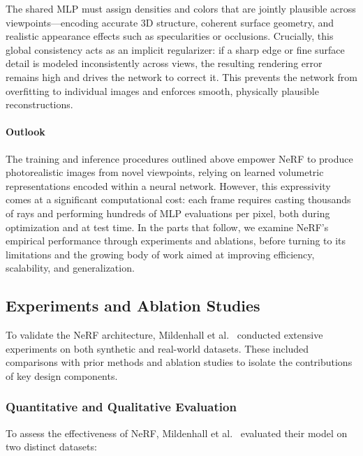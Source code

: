 The shared MLP must assign densities and colors that are jointly plausible across viewpoints—encoding accurate 3D structure, coherent surface geometry, and realistic appearance effects such as specularities or occlusions. Crucially, this global consistency acts as an implicit regularizer: if a sharp edge or fine surface detail is modeled inconsistently across views, the resulting rendering error remains high and drives the network to correct it. This prevents the network from overfitting to individual images and enforces smooth, physically plausible reconstructions. 

\paragraph{Outlook}

The training and inference procedures outlined above empower NeRF to produce photorealistic images from novel viewpoints, relying on learned volumetric representations encoded within a neural network. However, this expressivity comes at a significant computational cost: each frame requires casting thousands of rays and performing hundreds of MLP evaluations per pixel, both during optimization and at test time. In the parts that follow, we examine NeRF’s empirical performance through experiments and ablations, before turning to its limitations and the growing body of work aimed at improving efficiency, scalability, and generalization.

\newpage

\subsection{Experiments and Ablation Studies}
\label{subsec:chapter23_nerf_experiments_ablation}

To validate the NeRF architecture, Mildenhall et al.~\cite{mildenhall2020_nerf} conducted extensive experiments on both synthetic and real-world datasets. These included comparisons with prior methods and ablation studies to isolate the contributions of key design components.

\subsubsection{Quantitative and Qualitative Evaluation}
\label{subsubsec:chapter23_nerf_quantitative}

To assess the effectiveness of NeRF, Mildenhall et al.~\cite{mildenhall2020_nerf} evaluated their model on two distinct datasets:

